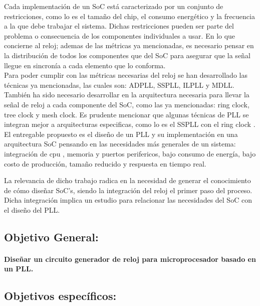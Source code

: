\documentclass[runningheads,a4paper]{llncs}
\begin{document}
Cada implementación de un SoC está caracterizado por un conjunto de restricciones, como lo es el tamaño del chip, el consumo energético y la frecuencia a la que debe trabajar el sistema. Dichas restricciones pueden ser parte del problema o consecuencia de los componentes individuales a usar. En lo que concierne al reloj; ademas de las métricas ya mencionadas, es necesario pensar en la distribución de todos los componentes que del SoC para asegurar que la señal llegue en sincronía a cada elemento que lo conforma.\\

Para poder cumplir con las métricas necesarias del reloj se han desarrollado las técnicas ya mencionadas, las cuales son: ADPLL, SSPLL, ILPLL y MDLL. También ha sido necesario desarrollar en la arquitectura necesaria para llevar la señal de reloj a cada componente del SoC, como las ya mencionadas: ring clock, tree clock y mesh clock. Es prudente mencionar que algunas técnicas de PLL se integran mejor a arquitecturas especificas, como lo es el SSPLL con el ring clock . El entregable propuesto es el diseño de un PLL y su implementación en una arquitectura SoC pensando en las necesidades más generales de un sistema: integración de cpu , memoria y puertos perifericos, bajo consumo de energía, bajo costo de producción, tamaño reducido y respuesta en tiempo real. 

La relevancia de dicho trabajo radica en la necesidad de generar el conocimiento de cómo diseñar SoC's, siendo la integración del reloj el primer paso del proceso. Dicha integración implica un estudio para relacionar las necesidades del SoC con el diseño del PLL. 


\subsection{Objetivo General:}
\paragraph{Diseñar un circuito generador de reloj para microprocesador basado en un PLL.}
\subsection{Objetivos específicos:}
\end{document}
